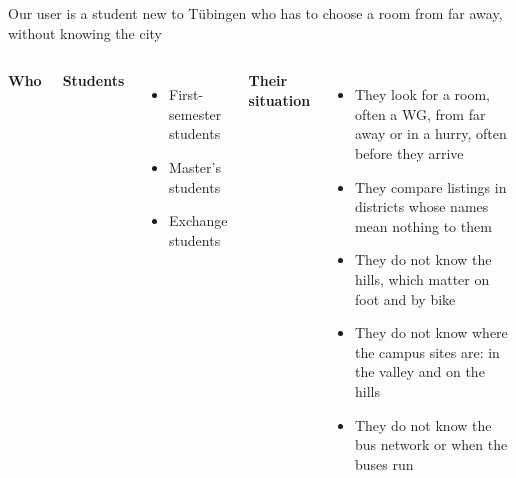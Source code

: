 \documentclass[aspectratio=169,10pt]{beamer}
\begin{document}
\begin{frame}{Our user is a student new to Tübingen who has to choose a room from far away,
  without knowing the city}
  \begin{columns}[T,onlytextwidth]
      \textbf{Who}\par\medskip
      \textbf{Students}
      \begin{itemize}\footnotesize
        \item First-semester students
        \item Master's students
        \item Exchange students
      \end{itemize}
      \textbf{Their situation}\par\smallskip
      \begin{itemize}\footnotesize
        \item They look for a room, often a WG, from far away or in a hurry, often before they
              arrive
        \item They compare listings in districts whose names mean nothing to them
        \item They do not know the hills, which matter on foot and by bike
        \item They do not know where the \factCampusSites{} campus sites are: in the valley
              and on the hills
        \item They do not know the bus network or when the buses run
      \end{itemize}
  \end{columns}
\end{frame}
\end{document}
